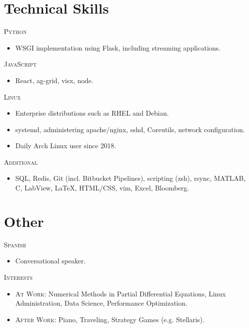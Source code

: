 \documentclass[openany,letterpaper,11pt]{article}
\newcommand{\skill}[2]{ %
    \begin{minipage}[t]{0.15\textwidth}
        \scshape#1
    \end{minipage}
    \vline\hspace{1em}
    \begin{minipage}[t]{0.83\textwidth}
        \raggedright
        #2
    \end{minipage}
}
\begin{document}
\section{Technical Skills}
\skill{Python}{
    \begin{itemize}
            \item WSGI implementation using
                Flask, including streaming applications.
    \end{itemize}
}
\skill{JavaScript}{
    \begin{itemize}
        \item React, ag-grid, visx, node.
    \end{itemize}
}
\skill{Linux}{
    \begin{itemize}
        \item Enterprise distributions such as RHEL and Debian. 
        \item systemd, administering apache/nginx, sshd, Coreutils, network configuration.
        \item Daily Arch Linux user since 2018.
    \end{itemize}
}

\skill{Additional}{
    \begin{itemize}
        \item SQL, Redis, Git (incl. Bitbucket Pipelines), scripting (zsh), 
            rsync, MATLAB, C, LabView, \LaTeX, HTML/CSS, vim, Excel, Bloomberg.
    \end{itemize}
}

\section{Other}
\skill{Spanish}{
    \begin{itemize}
        \item Conversational speaker.
    \end{itemize}
}
\skill{Interests}{
    \begin{itemize}
        \item {\scshape At Work}: 
            Numerical Methods in Partial Differential Equations, Linux Administration,
            Data Science, Performance Optimization.
        \item {\scshape After Work}: Piano, 
            Traveling, Strategy Games (e.g. Stellaris).
    \end{itemize}}
\end{document}
